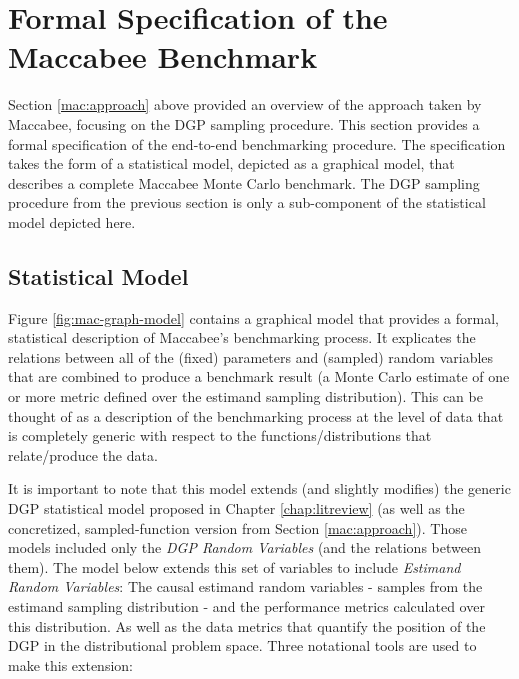 \documentclass[../main.tex]{subfiles}
\begin{document}
\section{Formal Specification of the Maccabee Benchmark} 
\label{mac:formalspec}

Section \ref{mac:approach} above provided an overview of the approach taken by Maccabee, focusing on the DGP sampling procedure. This section provides a formal specification of the end-to-end benchmarking procedure. The specification takes the form of a statistical model, depicted as a graphical model, that describes a complete Maccabee Monte Carlo benchmark. The DGP sampling procedure from the previous section is only a sub-component of the statistical model depicted here.

\subsection{Statistical Model}

Figure \ref{fig:mac-graph-model} contains a graphical model that provides a formal, statistical description of Maccabee's benchmarking process. It explicates the relations between all of the (fixed) parameters and (sampled) random variables that are combined to produce a benchmark result (a Monte Carlo estimate of one or more metric defined over the estimand sampling distribution). This can be thought of as a description of the benchmarking process at the level of data that is completely generic with respect to the functions/distributions that relate/produce the data.

\vspace{\baselineskip}

It is important to note that this model extends (and slightly modifies) the generic DGP statistical model proposed in Chapter \ref{chap:litreview} (as well as the concretized, sampled-function version from Section \ref{mac:approach}). Those models included only the \textit{DGP Random Variables} (and the relations between them). The model below extends this set of variables to include \textit{Estimand Random Variables}: The causal estimand random variables - samples from the estimand sampling distribution - and the performance metrics calculated over this distribution. As well as the data metrics that quantify the position of the DGP in the distributional problem space. Three notational tools are used to make this extension:
\end{document}
